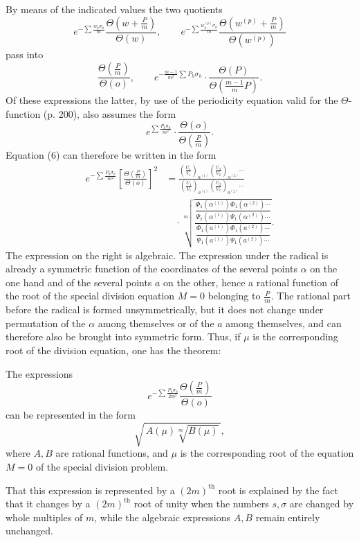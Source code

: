 \documentclass[10pt]{article}
\begin{document}
By means of the indicated values the two quotients
\[
e^{-\sum\frac{w_h\sigma_h}{m}}
\frac{\Theta\left(w+\frac Pm\right)}{\Theta(w)},\qquad
e^{-\sum\frac{w_h^{(p)}\sigma_h}{m}}
\frac{\Theta\left(w^{(p)}+\frac Pm\right)}{\Theta(w^{(p)})}
\]
pass into
\[
\frac{\Theta\left(\frac Pm\right)}{\Theta(o)},\qquad
e^{-\frac{m-1}{m^2}\sum P_h\sigma_h}\cdot
\frac{\Theta(P)}{\Theta\left(\frac{m-1}{m}P\right)}.
\]
Of these expressions the latter, by use of the periodicity equation valid for the \(\Theta\)-function (p. 200), also assumes the form
\[
e^{\sum\frac{P_h\sigma_h}{m^2}}\cdot
\frac{\Theta(o)}{\Theta\left(\frac Pm\right)}.
\]
Equation (6) can therefore be written in the form
\[
\begin{aligned}
e^{-\sum\frac{P_h\sigma_h}{m^2}}
\left[\frac{\Theta\left(\frac Pm\right)}{\Theta(o)}\right]^2
&=
\frac{\left(\frac{U_1}{V_1}\right)_{\alpha^{(1)}}
      \left(\frac{U_2}{V_2}\right)_{\alpha^{(2)}}\cdots}
     {\left(\frac{U_1}{V_1}\right)_{a^{(1)}}
      \left(\frac{U_2}{V_2}\right)_{a^{(2)}}\cdots} \\
&\quad{}\cdot
\sqrt[m]{\frac{
\dfrac{\Phi_1(\alpha^{(1)})\Phi_1(\alpha^{(2)})\cdots}
      {\Psi_1(\alpha^{(1)})\Psi_1(\alpha^{(2)})\cdots}
}{
\dfrac{\Phi_1(a^{(1)})\Phi_1(a^{(2)})\cdots}
      {\Psi_1(a^{(1)})\Psi_1(a^{(2)})\cdots}
}}.
\end{aligned}
\]
The expression on the right is algebraic. The expression under the radical is already a symmetric function of the coordinates of the several points \(\alpha\) on the one hand and of the several points \(a\) on the other, hence a rational function of the root of the special division equation \(M=0\) belonging to \(\frac Pm\). The rational part before the radical is formed unsymmetrically, but it does not change under permutation of the \(\alpha\) among themselves or of the \(a\) among themselves, and can therefore also be brought into symmetric form. Thus, if \(\mu\) is the corresponding root of the division equation, one has the theorem:

The expressions
\[
e^{-\sum\frac{P_h\sigma_h}{2m^2}}
\frac{\Theta\left(\frac Pm\right)}{\Theta(o)}
\]
can be represented in the form
\[
\sqrt{\,A(\mu)\sqrt[m]{B(\mu)}\,},
\]
where \(A,B\) are rational functions, and \(\mu\) is the corresponding root of the equation \(M=0\) of the special division problem.

That this expression is represented by a \((2m)^{\text{th}}\) root is explained by the fact that it changes by a \((2m)^{\text{th}}\) root of unity when the numbers \(s,\sigma\) are changed by whole multiples of \(m\), while the algebraic expressions \(A,B\) remain entirely unchanged.
\end{document}
